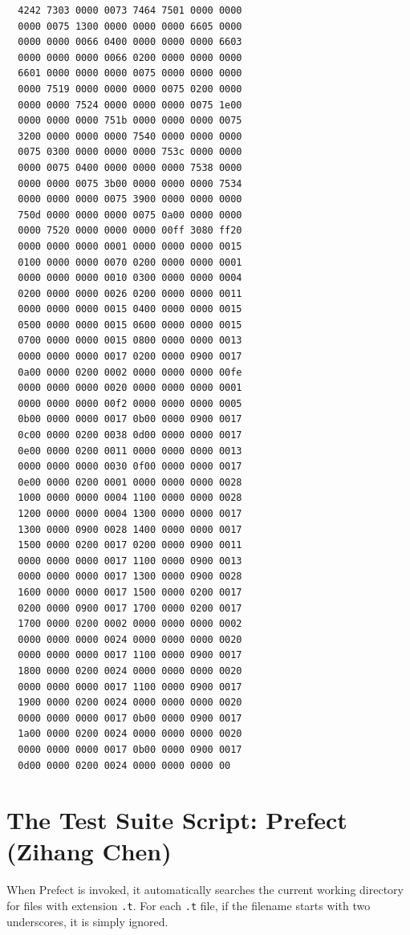 \documentclass{report}
\begin{document}
\begin{mdframed}[style=example]
\begin{verbatim}
  4242 7303 0000 0073 7464 7501 0000 0000
  0000 0075 1300 0000 0000 0000 6605 0000
  0000 0000 0066 0400 0000 0000 0000 6603
  0000 0000 0000 0066 0200 0000 0000 0000
  6601 0000 0000 0000 0075 0000 0000 0000
  0000 7519 0000 0000 0000 0075 0200 0000
  0000 0000 7524 0000 0000 0000 0075 1e00
  0000 0000 0000 751b 0000 0000 0000 0075
  3200 0000 0000 0000 7540 0000 0000 0000
  0075 0300 0000 0000 0000 753c 0000 0000
  0000 0075 0400 0000 0000 0000 7538 0000
  0000 0000 0075 3b00 0000 0000 0000 7534
  0000 0000 0000 0075 3900 0000 0000 0000
  750d 0000 0000 0000 0075 0a00 0000 0000
  0000 7520 0000 0000 0000 00ff 3080 ff20
  0000 0000 0000 0001 0000 0000 0000 0015
  0100 0000 0000 0070 0200 0000 0000 0001
  0000 0000 0000 0010 0300 0000 0000 0004
  0200 0000 0000 0026 0200 0000 0000 0011
  0000 0000 0000 0015 0400 0000 0000 0015
  0500 0000 0000 0015 0600 0000 0000 0015
  0700 0000 0000 0015 0800 0000 0000 0013
  0000 0000 0000 0017 0200 0000 0900 0017
  0a00 0000 0200 0002 0000 0000 0000 00fe
  0000 0000 0000 0020 0000 0000 0000 0001
  0000 0000 0000 00f2 0000 0000 0000 0005
  0b00 0000 0000 0017 0b00 0000 0900 0017
  0c00 0000 0200 0038 0d00 0000 0000 0017
  0e00 0000 0200 0011 0000 0000 0000 0013
  0000 0000 0000 0030 0f00 0000 0000 0017
  0e00 0000 0200 0001 0000 0000 0000 0028
  1000 0000 0000 0004 1100 0000 0000 0028
  1200 0000 0000 0004 1300 0000 0000 0017
  1300 0000 0900 0028 1400 0000 0000 0017
  1500 0000 0200 0017 0200 0000 0900 0011
  0000 0000 0000 0017 1100 0000 0900 0013
  0000 0000 0000 0017 1300 0000 0900 0028
  1600 0000 0000 0017 1500 0000 0200 0017
  0200 0000 0900 0017 1700 0000 0200 0017
  1700 0000 0200 0002 0000 0000 0000 0002
  0000 0000 0000 0024 0000 0000 0000 0020
  0000 0000 0000 0017 1100 0000 0900 0017
  1800 0000 0200 0024 0000 0000 0000 0020
  0000 0000 0000 0017 1100 0000 0900 0017
  1900 0000 0200 0024 0000 0000 0000 0020
  0000 0000 0000 0017 0b00 0000 0900 0017
  1a00 0000 0200 0024 0000 0000 0000 0020
  0000 0000 0000 0017 0b00 0000 0900 0017
  0d00 0000 0200 0024 0000 0000 0000 00
\end{verbatim}
\end{mdframed}

\section{The Test Suite Script: Prefect (Zihang Chen)}

When Prefect is invoked, it automatically searches the current working directory for files with extension \texttt{.t}. For each \texttt{.t} file, if the filename starts with two underscores, it is simply ignored.
\end{document}
